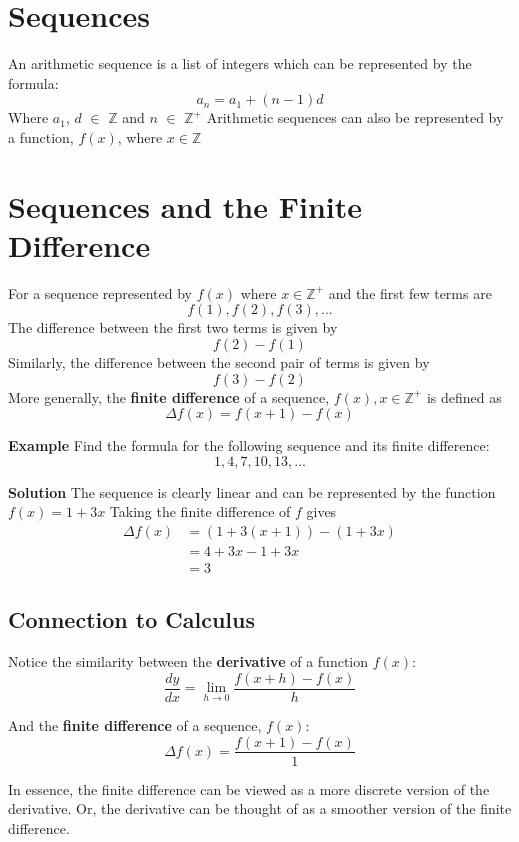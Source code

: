 \section{Sequences}
An arithmetic sequence is a list of integers which can be represented by the formula:
\[a_n = a_1 + (n - 1)d\] Where \(a_1\), \(d\) \(\in\) \(\mathbb{Z}\) and \(n\) \(\in\) \(\mathbb{Z}^+\)
\newline
Arithmetic sequences can also be represented by a function, \(f(x)\), where \(x\in\mathbb{Z}\)

\section{Sequences and the Finite Difference}
For a sequence represented by \(f(x)\) where \(x \in \mathbb{Z}^+\) and the first few terms are \[f(1), f(2), f(3), ...\]
The difference between the first two terms is given by \[f(2) - f(1)\] 
Similarly, the difference between the second pair of terms is given by \[f(3) - f(2)\]
More generally, the \textbf{finite difference} of a sequence, \(f(x), x \in \mathbb{Z}^+\) is defined as
\begin{equation} \label{eq:1}
    \Delta f(x) = f(x + 1) - f(x)
\end{equation}

\textbf{Example}
Find the formula for the following sequence and its finite difference: \[1,4,7,10,13,...\]

\textbf{Solution} 
The sequence is clearly linear and can be represented by the function \(f(x) = 1+3x\)
Taking the finite difference of \(f\) gives
\begin{align*}
    \Delta f(x) & = (1+3(x+1)) - (1 + 3x) \\
    & = 4+3x - 1+3x \\
    & = 3
\end{align*}

\subsection{Connection to Calculus}
Notice the similarity between the \textbf{derivative} of a function \(f(x)\): 
\begin{equation} \label{eq:2}
    \frac{dy}{dx} = \lim_{h \to 0}\frac{f(x+h) - f(x)}{h}
\end{equation}

And the \textbf{finite difference} of a sequence, \(f(x)\): 
\[\Delta f(x) = \frac{f(x+1) - f(x)}{1}\]

In essence, the finite difference can be viewed as a more discrete version of the derivative. Or, the derivative can be thought of as a smoother version of the finite difference.


